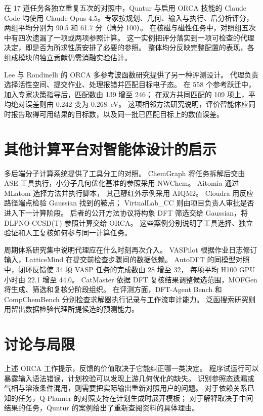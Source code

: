 \documentclass[UTF8,a4paper,11pt,fontset=fandol]{ctexart}
\begin{document}
在 17 道任务各独立重复五次的对照中，Quntur 与启用 ORCA 技能的 Claude Code
均使用 Claude Opus 4.5。专家按规划、几何、输入与执行、后分析评分，
两组平均分别为 90.5 和 61.7 分（满分 100）。
在核磁与磁性任务中，对照组五次中有四次遗漏了一项或两项参照计算\cite{quntur}。
这一实例把评分落实到一项可检查的代理决定，即是否为所求性质安排了必要的参照。
整体均分反映完整配置的表现，各组成模块的独立贡献仍需消融实验估计。

Lee 与 Rondinelli 的 ORCA 多参考波函数研究提供了另一种评测设计。
代理负责选择活性空间、提交作业、处理报错并匹配目标电子态。
在 558 个参考跃迁中，加入专家决策指导后，匹配数由 139 增至 246；
在双方共同匹配的 109 项上，平均绝对误差则由 0.242 变为 0.268~eV\cite{mr}。
这项相邻方法研究说明，评价智能体应同时报告取得可用结果的目标数，以及同一批已匹配目标上的数值误差。

\section{其他计算平台对智能体设计的启示}
多后端分子计算系统提供了工具分工的对照。
ChemGraph 将任务拆解后交由 ASE 工具执行，小分子几何优化基准的参照采用 NWChem。
Aitomia 通过 MLatom 选择方法并执行脚本，
其己醇红外示例采用 AIQM2\cite{chemgraph,aitomia}。
Cloudra 用反应路径端点检验 Gaussian 找到的鞍点；
VirtualLab\_CC 则由项目负责人审批是否进入下一计算阶段。
后者的公开方法协议将构象 DFT 筛选交给 Gaussian，将 DLPNO-CCSD(T) 参照计算交给 ORCA\cite{cloudra,virtuallab}。
这些案例分别说明了工具选择、独立验证和人工复核如何参与同一计算任务。

周期体系研究集中说明代理应在什么时刻再次介入。
VASPilot 根据作业日志修订输入，LatticeMind 在提交前检查步骤间的数据依赖\cite{vaspilot,lattice}。
AutoDFT 的同模型对照中，闭环反馈使 34 项 VASP 任务的完成数由 28 增至 32，
每项平均 H100 GPU 小时由 22.1 增至 44.0\cite{autodft}。
CatMaster 依据 DFT 复核结果调整候选范围，MOFGen 将生成、筛选和复核分阶段组织\cite{catmaster,mofgen}。
在评测方面，DFT-Agent Bench 和 CompChemBench 分别检查求解器执行记录与工作流审计能力。
泛函搜索研究则用留出数据检验代理所提候选的预测能力\cite{dftbench,compbench,xc}。

\section{讨论与局限}
上述 ORCA 工作提示，反馈的价值取决于它能纠正哪一类决定。
程序试运行可以暴露输入语法错误，计划校验可以发现上游几何优化的缺失。
识别参照态遗漏或气相与溶液条件混用，则需要把实际输出重新对照用户的问题。
对于依赖关系已知的任务，Q-Planner 的对照支持在计划生成时展开模板；
对于解释取决于中间结果的任务，Quntur 的案例给出了重新查阅资料的具体理由\cite{qplanner,quntur}。
\end{document}
